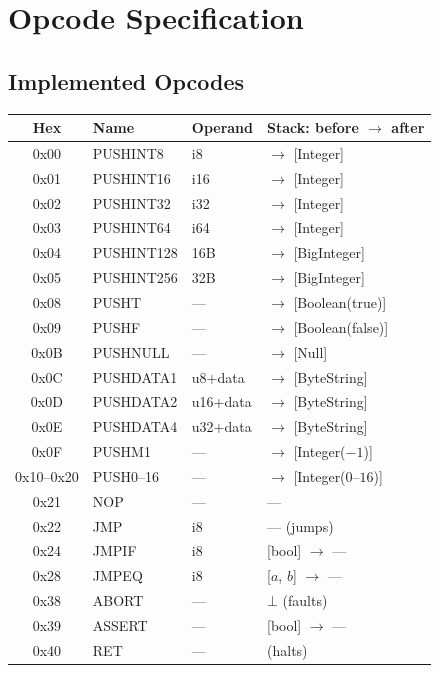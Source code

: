 \documentclass[11pt,a4paper]{article}
\begin{document}
\section{Opcode Specification}

\subsection{Implemented Opcodes}

\begin{longtable}{@{}cllp{6cm}@{}}
\toprule
\textbf{Hex} & \textbf{Name} & \textbf{Operand} & \textbf{Stack: before $\to$ after} \\
\midrule
\endhead
0x00 & PUSHINT8 & i8 & $\to$ [Integer] \\
0x01 & PUSHINT16 & i16 & $\to$ [Integer] \\
0x02 & PUSHINT32 & i32 & $\to$ [Integer] \\
0x03 & PUSHINT64 & i64 & $\to$ [Integer] \\
0x04 & PUSHINT128 & 16B & $\to$ [BigInteger] \\
0x05 & PUSHINT256 & 32B & $\to$ [BigInteger] \\
0x08 & PUSHT & --- & $\to$ [Boolean(true)] \\
0x09 & PUSHF & --- & $\to$ [Boolean(false)] \\
0x0B & PUSHNULL & --- & $\to$ [Null] \\
0x0C & PUSHDATA1 & u8+data & $\to$ [ByteString] \\
0x0D & PUSHDATA2 & u16+data & $\to$ [ByteString] \\
0x0E & PUSHDATA4 & u32+data & $\to$ [ByteString] \\
0x0F & PUSHM1 & --- & $\to$ [Integer($-1$)] \\
0x10--0x20 & PUSH0--16 & --- & $\to$ [Integer($0$--$16$)] \\
0x21 & NOP & --- & --- \\
0x22 & JMP & i8 & --- (jumps) \\
0x24 & JMPIF & i8 & [bool] $\to$ --- \\
0x28 & JMPEQ & i8 & [$a$, $b$] $\to$ --- \\
0x38 & ABORT & --- & $\bot$ (faults) \\
0x39 & ASSERT & --- & [bool] $\to$ --- \\
0x40 & RET & --- & (halts) \\

\end{longtable}
\end{document}
